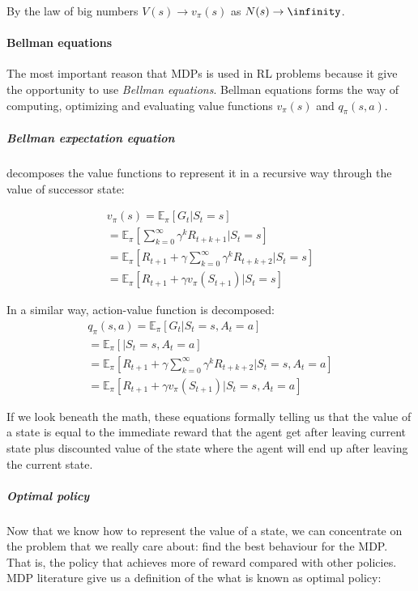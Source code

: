 By the law of big numbers $V(s) \rightarrow v_{\pi}(s)$ as $N(s) \rightarrow \infinity$.



\paragraph{Bellman equations} The most important reason that MDPs is used in RL problems because
it give the opportunity to use \emph{Bellman equations}. Bellman equations forms the way
of computing, optimizing and evaluating value functions $v_{\pi}(s)$ and $q_{\pi}(s, a)$.

\subparagraph{Bellman expectation equation} decomposes the value functions to represent it
in a recursive way through the value of successor state:

\begin{align*}
	v_{\pi}(s) = \mathbb{E}_{\pi} [G_t |S_t = s] \\
		= \mathbb{E}_{\pi} [\sum_{k=0}^{\infty} \gamma^k R_{t+k+1} |S_t = s] \\
		= \mathbb{E}_{\pi} [R_{t+1} + \gamma \sum_{k=0}^{\infty} \gamma^k R_{t+k+2} |S_t = s] \\
		= \mathbb{E}_{\pi} [R_{t+1} + \gamma v_{\pi}(S_{t+1}) | S_t = s]
\end{align*}

In a similar way, action-value function is decomposed:
\begin{align*}
	q_{\pi}(s, a) = \mathbb{E}_{\pi} [G_t |S_t = s, A_t = a] \\
		= \mathbb{E}_{\pi} [ |S_t = s, A_t = a] \\
		= \mathbb{E}_{\pi} [R_{t+1} + \gamma \sum_{k=0}^{\infty} \gamma^k R_{t+k+2} |S_t = s, A_t = a] \\
		= \mathbb{E}_{\pi} [R_{t+1} + \gamma v_{\pi}(S_{t+1}) | S_t = s, A_t = a]
\end{align*}

If we look beneath the math, these equations formally telling us that the value of a state is equal to the
immediate reward that the agent get after leaving current state plus discounted value
of the state where the agent will end up after leaving the current state.



\subparagraph{Optimal policy}

Now that we know how to represent the value of
a state, we can concentrate on the problem that we really care about:
find the best behaviour for the MDP. That is, the policy that achieves more of reward
compared with other policies.
MDP literature give us a definition of the what is
known as optimal policy:

